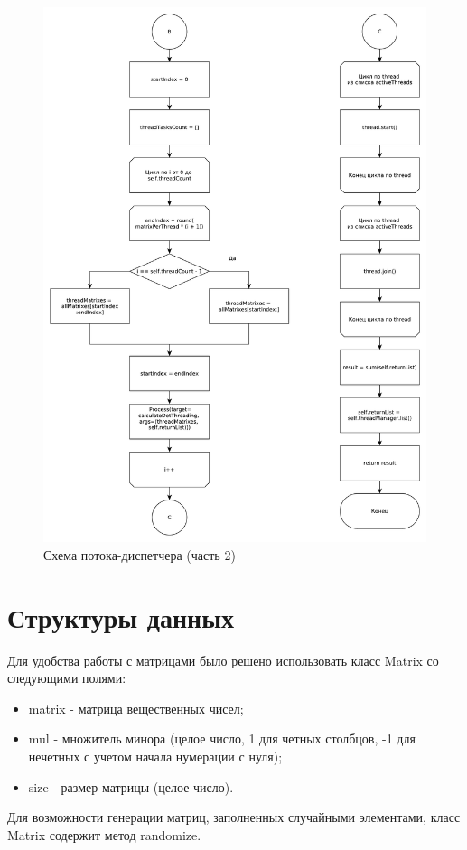\documentclass[a4paper,oneside,14pt]{extreport}
\begin{document}
\begin{figure}[H]
	\centering
	\includegraphics[width=0.90\linewidth]{images/solver_part_2}
	\caption{Схема потока-диспетчера (часть 2)}
	\label{img:solver_2}
\end{figure}

\section{Структуры данных}
Для удобства работы с матрицами было решено использовать класс Matrix со следующими полями:
\begin{itemize}
	\item matrix - матрица вещественных чисел;
	\item mul - множитель минора (целое число, 1 для четных столбцов, -1 для нечетных с учетом начала нумерации с нуля);
	\item size - размер матрицы (целое число).
\end{itemize}

Для возможности генерации матриц, заполненных случайными элементами, класс Matrix содержит метод randomize.
\end{document}
